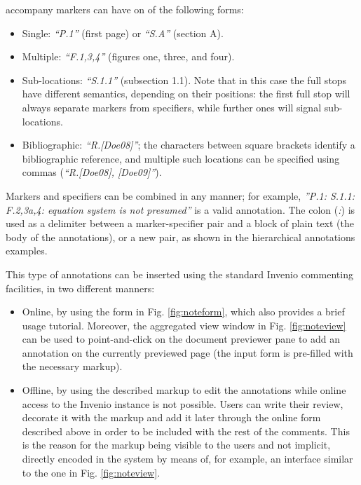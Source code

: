 accompany markers can have on of the following forms:
\begin{itemize}
  \item Single: \textit{``P.1''} (first page) or \textit{``S.A''} (section A).
  \item Multiple: \textit{``F.1,3,4''} (figures one, three, and four).
  \item Sub-locations: \textit{``S.1.1''} (subsection 1.1). Note that in this
                       case the full stops have different semantics, depending on
                       their positions: the first full stop will always separate
                       markers from specifiers, while further ones will signal
                       sub-locations.
  \item Bibliographic: \textit{``R.[Doe08]''}; the characters between square
                       brackets identify a bibliographic reference, and multiple
                       such locations can be specified using commas
                       (\textit{``R.[Doe08], [Doe09]''}).
\end{itemize}

Markers and specifiers can be combined in any manner; for example,
\textit{''P.1: S.1.1: F.2,3a,4: equation system is not presumed''} is a valid
annotation.  The colon (\textit{:}) is used as a delimiter between a
marker-specifier pair and a block of plain text (the body of the annotations),
or a new pair, as shown in the hierarchical annotations examples.

This type of annotations can be inserted using the standard Invenio
commenting facilities, in two different manners:

\begin{itemize}
  \item Online, by using the form in Fig. \ref{fig:noteform}, which also
        provides a brief usage tutorial. Moreover, the aggregated view window in
        Fig. \ref{fig:noteview} can be used to point-and-click on the document
        previewer pane to add an annotation on the currently previewed page (the
        input form is pre-filled with the necessary markup).
  \item Offline, by using the described markup to edit the annotations while
        online access to the Invenio instance is not possible. Users can write
        their review, decorate it with the markup and add it later through the
        online form described above in order to be included with the rest of the
        comments. This is the reason for the markup being visible to the users
        and not implicit, directly encoded in the system by means of, for
        example, an interface similar to the one in Fig. \ref{fig:noteview}.
\end{itemize}

